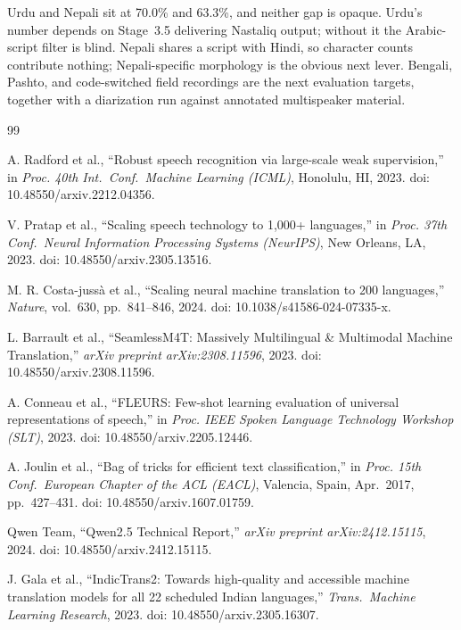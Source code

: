 \documentclass[conference]{IEEEtran}
\begin{document}
Urdu and Nepali sit at 70.0\% and 63.3\%, and neither gap is opaque. Urdu's number depends on Stage~3.5 delivering Nastaliq output; without it the Arabic-script filter is blind. Nepali shares a script with Hindi, so character counts contribute nothing; Nepali-specific morphology is the obvious next lever. Bengali, Pashto, and code-switched field recordings are the next evaluation targets, together with a diarization run against annotated multispeaker material.

\begin{thebibliography}{99}

 A. Radford et al., ``Robust speech recognition via large-scale weak supervision,'' in \textit{Proc. 40th Int.\ Conf.\ Machine Learning (ICML)}, Honolulu, HI, 2023. doi: 10.48550/arxiv.2212.04356.

 V. Pratap et al., ``Scaling speech technology to 1,000+ languages,'' in \textit{Proc. 37th Conf.\ Neural Information Processing Systems (NeurIPS)}, New Orleans, LA, 2023. doi: 10.48550/arxiv.2305.13516.

 M. R. Costa-juss\`a et al., ``Scaling neural machine translation to 200 languages,'' \textit{Nature}, vol.~630, pp.~841--846, 2024. doi: 10.1038/s41586-024-07335-x.

 L. Barrault et al., ``SeamlessM4T: Massively Multilingual \& Multimodal Machine Translation,'' \textit{arXiv preprint arXiv:2308.11596}, 2023. doi: 10.48550/arxiv.2308.11596.

 A. Conneau et al., ``FLEURS: Few-shot learning evaluation of universal representations of speech,'' in \textit{Proc. IEEE Spoken Language Technology Workshop (SLT)}, 2023. doi: 10.48550/arxiv.2205.12446.

 A. Joulin et al., ``Bag of tricks for efficient text classification,'' in \textit{Proc. 15th Conf.\ European Chapter of the ACL (EACL)}, Valencia, Spain, Apr.\ 2017, pp.~427--431. doi: 10.48550/arxiv.1607.01759.

 Qwen Team, ``Qwen2.5 Technical Report,'' \textit{arXiv preprint arXiv:2412.15115}, 2024. doi: 10.48550/arxiv.2412.15115.

 J. Gala et al., ``IndicTrans2: Towards high-quality and accessible machine translation models for all 22 scheduled Indian languages,'' \textit{Trans.\ Machine Learning Research}, 2023. doi: 10.48550/arxiv.2305.16307.


\end{thebibliography}
\end{document}
